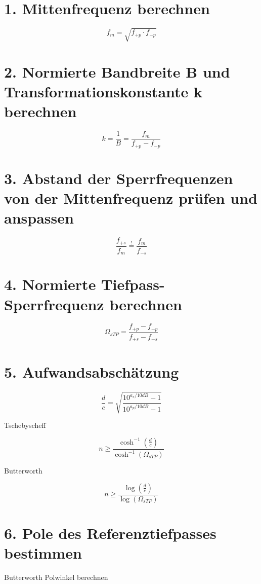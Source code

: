\documentclass[a4paper, 12pt]{report}
\begin{document}
\section*{1. Mittenfrequenz berechnen}
	\[ f_m = \sqrt{f_{+p} \cdot f_{-p}} \]
	
\section*{2. Normierte Bandbreite B und Transformationskonstante k berechnen}
	\[ k = \frac{1}{B} = \frac{f_m}{f_{+p} - f_{-p}} \]
	
\section*{3. Abstand der Sperrfrequenzen von der Mittenfrequenz prüfen und anspassen}
	\[ \frac{f_{+s}}{f_m} \stackrel{!}{=} \frac{f_m}{f_{-s}} \]
	
\section*{4. Normierte Tiefpass-Sperrfrequenz berechnen}
	\[ \Omega_{sTP} = \frac{f_{+p} - f_{-p}}{f_{+s} - f_{-s}} \]
	
\section*{5. Aufwandsabschätzung}
	\begin{minipage}[t]{0.33\textwidth} 
			\[  \frac{d}{c} = \sqrt{\frac{10^{a_s / 10dB} - 1}{10^{a_p / 10dB} - 1}}  \]
	\end{minipage} 
	\begin{minipage}[t]{0.33\textwidth} 
			\begin{center}
			Tschebyscheff
			\end{center}
			\[ n \ge \frac{\cosh^{-1}{\left(\frac{d}{c}\right)}}{\cosh^{-1}{\left(\Omega_{sTP}\right)}} \]
	\end{minipage}
	\begin{minipage}[t]{0.33\textwidth} 
			\begin{center}
			Butterworth
			\end{center}
			\[ n \ge \frac{\log{\left(\frac{d}{c}\right)}}{\log{\left(\Omega_{sTP}\right)}} \]
	\end{minipage}
	
\section*{6. Pole des Referenztiefpasses bestimmen}
	Butterworth Polwinkel berechnen
	
\end{document}
